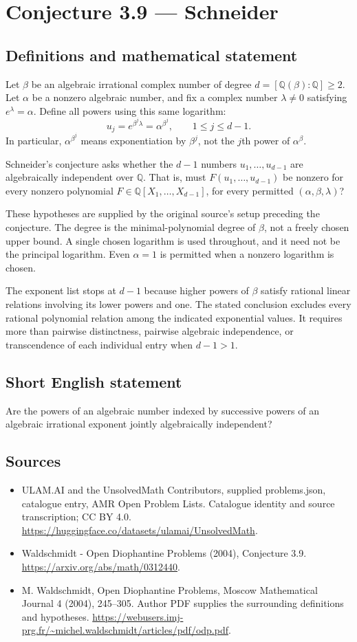 \documentclass[11pt,a4paper]{article}
\begin{document}
\section*{Conjecture 3.9 — Schneider}\label{statement}

\subsection{Definitions and mathematical statement}
Let $\beta$ be an algebraic irrational complex number of degree $d=[\mathbb Q(\beta):\mathbb Q]\ge2$. Let $\alpha$ be a nonzero algebraic number, and fix a complex number $\lambda\ne0$ satisfying $e^\lambda=\alpha$. Define all powers using this same logarithm:
\[
u_j=e^{\beta^j\lambda}=\alpha^{\beta^j},\qquad 1\le j\le d-1.
\]
In particular, $\alpha^{\beta^j}$ means exponentiation by $\beta^j$, not the $j$th power of $\alpha^\beta$.

Schneider's conjecture asks whether the $d-1$ numbers $u_1,\ldots,u_{d-1}$ are algebraically independent over $\mathbb Q$. That is, must $F(u_1,\ldots,u_{d-1})$ be nonzero for every nonzero polynomial $F\in\mathbb Q[X_1,\ldots,X_{d-1}]$, for every permitted $(\alpha,\beta,\lambda)$?

These hypotheses are supplied by the original source's setup preceding the conjecture. The degree is the minimal-polynomial degree of $\beta$, not a freely chosen upper bound. A single chosen logarithm is used throughout, and it need not be the principal logarithm. Even $\alpha=1$ is permitted when a nonzero logarithm is chosen.

The exponent list stops at $d-1$ because higher powers of $\beta$ satisfy rational linear relations involving its lower powers and one. The stated conclusion excludes every rational polynomial relation among the indicated exponential values. It requires more than pairwise distinctness, pairwise algebraic independence, or transcendence of each individual entry when $d-1>1$.
\subsection{Short English statement}
Are the powers of an algebraic number indexed by successive powers of an algebraic irrational exponent jointly algebraically independent?
\subsection{Sources}
\begin{itemize}
\item[S1] ULAM.AI and the UnsolvedMath Contributors, supplied problems.json, catalogue entry, AMR Open Problem Lists. Catalogue identity and source transcription; CC BY 4.0.
\url{https://huggingface.co/datasets/ulamai/UnsolvedMath}.
\item[S2] Waldschmidt - Open Diophantine Problems (2004), Conjecture 3.9. 
\url{https://arxiv.org/abs/math/0312440}.
\item[S3] M. Waldschmidt, Open Diophantine Problems, Moscow Mathematical Journal 4 (2004), 245–305. Author PDF supplies the surrounding definitions and hypotheses.
\url{https://webusers.imj-prg.fr/~michel.waldschmidt/articles/pdf/odp.pdf}.
\end{itemize}
\end{document}
